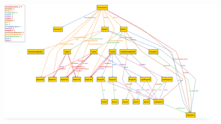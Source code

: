 \clearpage

\begin{landscape}
\begin{figure}[h]
    \centering
    \includegraphics[scale=0.5]{images/AlloyView.png} 
    \label{fig_PushGitHubSD}
\end{figure}
\end{landscape}

\clearpage

